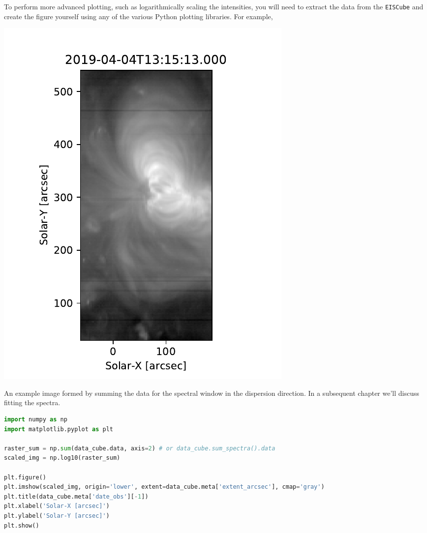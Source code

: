To perform more advanced plotting, such as logarithmically scaling the intensities, you will need to extract the data from the \verb+EISCube+ and create the figure yourself using any of the various Python plotting libraries. For example,
\begin{marginfigure}
  \centerline{\includegraphics[clip,width=\linewidth]{figures/ex_log-scaled_raster.pdf}}
  \caption{An example image formed by summing the data for the  spectral window in the
    dispersion direction. In a subsequent chapter we'll discuss fitting the spectra.}
  \label{fig:raster}
\end{marginfigure}

\begin{lstlisting}[language=Python]
import numpy as np
import matplotlib.pyplot as plt

raster_sum = np.sum(data_cube.data, axis=2) # or data_cube.sum_spectra().data
scaled_img = np.log10(raster_sum)

plt.figure()
plt.imshow(scaled_img, origin='lower', extent=data_cube.meta['extent_arcsec'], cmap='gray')
plt.title(data_cube.meta['date_obs'][-1])
plt.xlabel('Solar-X [arcsec]')
plt.ylabel('Solar-Y [arcsec]')
plt.show()
\end{lstlisting}

